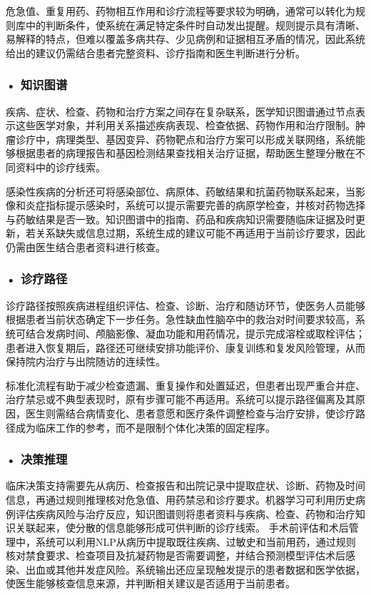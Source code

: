 危急值、重复用药、药物相互作用和诊疗流程等要求较为明确，通常可以转化为规则库中的判断条件，使系统在满足特定条件时自动发出提醒。规则提示具有清晰、易解释的特点，但难以覆盖多病共存、少见病例和证据相互矛盾的情况，因此系统给出的建议仍需结合患者完整资料、诊疗指南和医生判断进行分析。


\subsubsection*{\textbf{• 知识图谱}}

疾病、症状、检查、药物和治疗方案之间存在复杂联系，医学知识图谱通过节点表示这些医学对象，并利用关系描述疾病表现、检查依据、药物作用和治疗限制。肿瘤诊疗中，病理类型、基因变异、药物靶点和治疗方案可以形成关联网络，系统能够根据患者的病理报告和基因检测结果查找相关治疗证据，帮助医生整理分散在不同资料中的诊疗线索。

感染性疾病的分析还可将感染部位、病原体、药敏结果和抗菌药物联系起来，当影像和炎症指标提示感染时，系统可以提示需要完善的病原学检查，并核对药物选择与药敏结果是否一致。知识图谱中的指南、药品和疾病知识需要随临床证据及时更新，若关系缺失或信息过期，系统生成的建议可能不再适用于当前诊疗要求，因此仍需由医生结合患者资料进行核查。

\subsubsection*{\textbf{• 诊疗路径}}

诊疗路径按照疾病进程组织评估、检查、诊断、治疗和随访环节，使医务人员能够根据患者当前状态确定下一步任务。急性缺血性脑卒中的救治对时间要求较高，系统可结合发病时间、颅脑影像、凝血功能和用药情况，提示完成溶栓或取栓评估；患者进入恢复期后，路径还可继续安排功能评价、康复训练和复发风险管理，从而保持院内治疗与出院随访的连续性。

标准化流程有助于减少检查遗漏、重复操作和处置延迟，但患者出现严重合并症、治疗禁忌或不典型表现时，原有步骤可能不再适用。系统可以提示路径偏离及其原因，医生则需结合病情变化、患者意愿和医疗条件调整检查与治疗安排，使诊疗路径成为临床工作的参考，而不是限制个体化决策的固定程序。
\subsubsection*{\textbf{• 决策推理}}

临床决策支持需要先从病历、检查报告和出院记录中提取症状、诊断、药物及时间信息，再通过规则推理核对危急值、用药禁忌和诊疗要求。机器学习可利用历史病例评估疾病风险与治疗反应，知识图谱则将患者资料与疾病、检查、药物和治疗知识关联起来，使分散的信息能够形成可供判断的诊疗线索。
手术前评估和术后管理中，系统可以利用NLP从病历中提取既往疾病、过敏史和当前用药，通过规则核对禁食要求、检查项目及抗凝药物是否需要调整，并结合预测模型评估术后感染、出血或其他并发症风险。系统输出还应呈现触发提示的患者数据和医学依据，使医生能够核查信息来源，并判断相关建议是否适用于当前患者。


